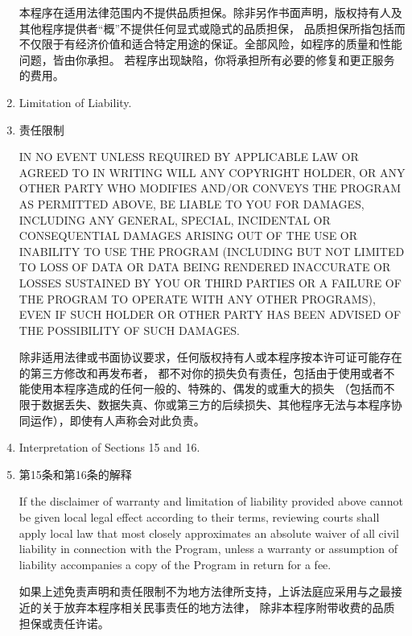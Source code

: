 \documentclass[11pt]{article}
\begin{document}
\begin{enumerate}
\begin{sloppypar}
          本程序在适用法律范围内不提供品质担保。除非另作书面声明，版权持有人及其他程序提供者“概”不提供任何显式或隐式的品质担保，
          品质担保所指包括而不仅限于有经济价值和适合特定用途的保证。全部风险，如程序的质量和性能问题，皆由你承担。
          若程序出现缺陷，你将承担所有必要的修复和更正服务的费用。

        \end{sloppypar}

  \item Limitation of Liability.
  \item 责任限制

        IN NO EVENT UNLESS REQUIRED BY APPLICABLE LAW OR AGREED TO IN
        WRITING WILL ANY COPYRIGHT HOLDER, OR ANY OTHER PARTY WHO MODIFIES
        AND/OR CONVEYS THE PROGRAM AS PERMITTED ABOVE, BE LIABLE TO YOU FOR
        DAMAGES, INCLUDING ANY GENERAL, SPECIAL, INCIDENTAL OR CONSEQUENTIAL
        DAMAGES ARISING OUT OF THE USE OR INABILITY TO USE THE PROGRAM
        (INCLUDING BUT NOT LIMITED TO LOSS OF DATA OR DATA BEING RENDERED
        INACCURATE OR LOSSES SUSTAINED BY YOU OR THIRD PARTIES OR A FAILURE
        OF THE PROGRAM TO OPERATE WITH ANY OTHER PROGRAMS), EVEN IF SUCH
        HOLDER OR OTHER PARTY HAS BEEN ADVISED OF THE POSSIBILITY OF SUCH
        DAMAGES.
        
        除非适用法律或书面协议要求，任何版权持有人或本程序按本许可证可能存在的第三方修改和再发布者，
        都不对你的损失负有责任，包括由于使用或者不能使用本程序造成的任何一般的、特殊的、偶发的或重大的损失
        （包括而不限于数据丢失、数据失真、你或第三方的后续损失、其他程序无法与本程序协同运作），即使有人声称会对此负责。

  \item Interpretation of Sections 15 and 16.
  
  \item 第15条和第16条的解释

        If the disclaimer of warranty and limitation of liability provided
        above cannot be given local legal effect according to their terms,
        reviewing courts shall apply local law that most closely approximates
        an absolute waiver of all civil liability in connection with the
        Program, unless a warranty or assumption of liability accompanies a
        copy of the Program in return for a fee.

        如果上述免责声明和责任限制不为地方法律所支持，上诉法庭应采用与之最接近的关于放弃本程序相关民事责任的地方法律，
        除非本程序附带收费的品质担保或责任许诺。



\end{enumerate}
\end{document}
